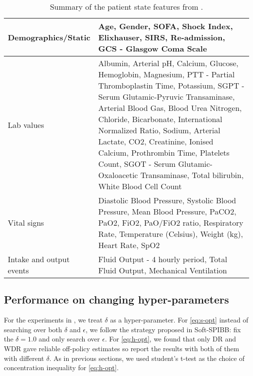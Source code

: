 \begin{table*}[h]
    \centering
    \caption{Summary of the patient state features from \citep[][Table 3]{tang2020clinician}.}
    \label{table:sepsis-features-summary}
    \begin{tabular}{lp{9cm}}
        \toprule
        Demographics/Static &  Age, Gender, SOFA, Shock Index, Elixhauser, SIRS, Re-admission, GCS - Glasgow Coma Scale \\
        \midrule
        Lab values & Albumin, Arterial pH, Calcium, Glucose, Hemoglobin, Magnesium, PTT - Partial Thromboplastin Time, Potassium, SGPT - Serum Glutamic-Pyruvic Transaminase, Arterial Blood Gas, Blood Urea Nitrogen, Chloride, Bicarbonate, International Normalized Ratio, Sodium, Arterial Lactate, CO2, Creatinine, Ionised Calcium, Prothrombin Time, Platelets Count, SGOT - Serum Glutamic-Oxaloacetic Transaminase, Total bilirubin, White Blood Cell Count \\
        \midrule
        Vital signs & Diastolic Blood Pressure, Systolic Blood Pressure, Mean Blood Pressure, PaCO2, PaO2, FiO2, PaO/FiO2 ratio, Respiratory Rate, Temperature (Celsius), Weight (kg), Heart Rate, SpO2 \\
        \midrule
        Intake and output events & Fluid Output - 4 hourly period, Total Fluid Output, Mechanical Ventilation \\
        \bottomrule
    \end{tabular}

\end{table*}




\subsection{Performance on changing hyper-parameters}
\label{app:sepsis-hyperparams}

For the experiments in , we treat $\delta$ as a hyper-parameter. For \ref{eq:s-opt} instead of searching over both $\delta$ and $\epsilon$, we follow the strategy proposed in Soft-SPIBB: fix the $\delta=1.0$ and only search over $\epsilon$. 
For \ref{eq:h-opt}, we found that only DR and WDR gave reliable off-policy estimates so report the results with both of them with different $\delta$. As in previous sections, we used student's t-test as the choice of concentration inequality for \ref{eq:h-opt}.



